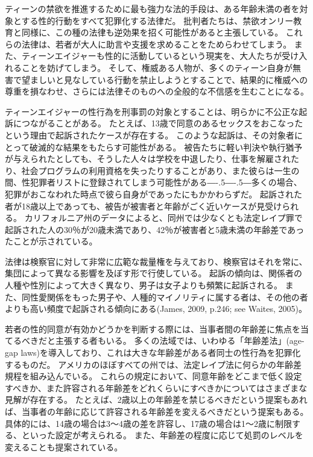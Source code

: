 \documentclass[paper=a4,book,openany]{jlreq}
\def\DDASH{―\kern-.5\zw―\kern-.5\zw―} %
\begin{document}
ティーンの禁欲を推進するために最も強力な法的手段は、ある年齢未満の者を対象とする性的行動をすべて犯罪化する法律だ。
批判者たちは、禁欲オンリー教育と同様に、この種の法律も逆効果を招く可能性があると主張している。
これらの法律は、若者が大人に助言や支援を求めることをためらわせてしまう。
また、ティーンエイジャーも性的に活動しているという現実を、大人たちが受け入れることを妨げてしまう。
そして、権威ある人物が、多くのティーン自身が無害で望ましいと見なしている行動を禁止しようとすることで、結果的に権威への尊重を損なわせ、さらには法律そのものへの全般的な不信感を生むことになる。

ティーンエイジャーの性行為を刑事罰の対象とすることは、明らかに不公正な起訴につながることがある。
たとえば、13歳で同意のあるセックスをおこなったという理由で起訴されたケースが存在する。
このような起訴は、その対象者にとって破滅的な結果をもたらす可能性がある。
被告たちに軽い判決や執行猶予が与えられたとしても、そうした人々は学校を中退したり、仕事を解雇されたり、社会プログラムの利用資格を失ったりすることがあり、また彼らは一生の間、性犯罪者リストに登録されてしまう可能性がある{\DDASH}多くの場合、犯罪がおこなわれた時点で彼ら自身がであったにもかかわらずだ。
起訴された者が18歳以上であっても、被告が被害者と年齢がごく近いケースが見受けられる。
カリフォルニア州のデータによると、同州では少なくとも法定レイプ罪で起訴された人の30％が20歳未満であり、42％が被害者と5歳未満の年齢差であったことが示されている\citep[pp.51--52]{ccasa2008}。

法律は検察官に対して非常に広範な裁量権を与えており、検察官はそれを常に、集団によって異なる影響を及ぼす形で行使している。
起訴の傾向は、関係者の人種や性別によって大きく異なり、男子は女子よりも頻繁に起訴される。
また、同性愛関係をもった男子や、人種的マイノリティに属する者は、その他の者よりも高い頻度で起訴される傾向にある(James, 2009, p.246; see Waites, 2005)。
\nocite{james09:_romeo_juliet_were_sex_offen}\nocite{waites04:_age_consen_sexual_consen}

若者の性的同意が有効かどうかを判断する際には、当事者間の年齢差に焦点を当てるべきだと主張する者もいる。
多くの法域では、いわゆる「年齢差法」(age-gap laws)を導入しており、これは大きな年齢差がある者同士の性行為を犯罪化するものだ。
アメリカのほぼすべての州では、法定レイプ法に何らかの年齢差規程を組み込んでいる。
これらの規定において、同意年齢をどこまで低く設定すべきか、また許容される年齢差をどれくらいにすべきかについてはさまざまな見解が存在する。
たとえば、2歳以上の年齢差を禁じるべきだという提案もあれば\citep{waites04:_age_consen_sexual_consen}、当事者の年齢に応じて許容される年齢差を変えるべきだという提案もある。
具体的には、14歳の場合は3～4歳の差を許容し、17歳の場合は1～2歳に制限する、といった設定が考えられる。
また、年齢差の程度に応じて処罰のレベルを変えることも提案されている。
\end{document}
